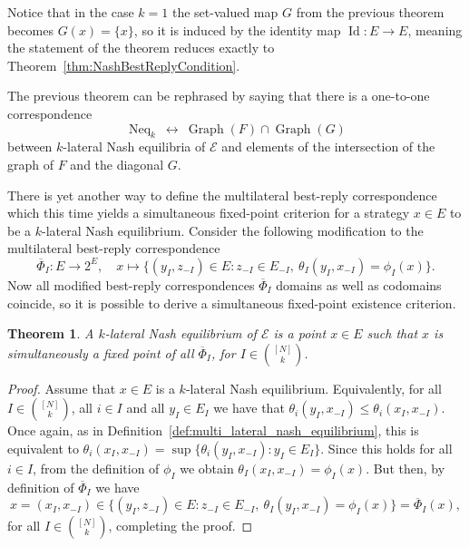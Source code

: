 \documentclass[a4paper,11pt,reqno,english]{amsart}
\theoremstyle{plain}
\newtheorem{theorem}{Theorem}[section]
\theoremstyle{definition}
\newcommand{\Ecal}{\mathcal{E}}
\DeclareMathOperator{\NashEquilibria}{Neq}
\begin{document}
\medskip
Notice that in the case $k = 1$ the set-valued map $G$ from the previous theorem becomes $G(x)=\{x\}$, so it is induced by the identity map $\operatorname{Id}\colon E\longrightarrow E$, meaning the statement of the theorem reduces exactly to Theorem~\ref{thm:NashBestReplyCondition}.

\medskip
The previous theorem can be rephrased by saying that there is a one-to-one correspondence
\begin{displaymath}
	\NashEquilibria_k \ \longleftrightarrow  \ \operatorname{Graph}(F)\cap\operatorname{Graph}(G)
\end{displaymath}
between $k$-lateral Nash equilibria of $\Ecal$ and elements of the intersection of the graph of $F$ and the diagonal $G$.

There is yet another way to define the multilateral best-reply correspondence which this time yields a simultaneous fixed-point criterion for a strategy $x\in E$ to be a $k$-lateral Nash equilibrium. Consider the following modification to the multilateral best-reply correspondence
\begin{displaymath}
	\overline{\Phi}_I\colon E\longrightarrow 2^{E}, \quad x\longmapsto \{(y_I, z_{-I})\in E \colon z_{-I}\in E_{-I},\ \theta_I(y_I, x_{-I}) = \phi_I(x)\}.
\end{displaymath}
Now all modified best-reply correspondences $\overline{\Phi}_I$ domains as well as codomains coincide, so it is possible to derive a simultaneous fixed-point existence criterion.
\begin{theorem}\label{thm:SimultaneousFixedPointCriterion}
	A $k$-lateral Nash equilibrium of $\Ecal$ is a point $x\in E$ such that $x$ is simultaneously a fixed point of all $\overline{\Phi}_I$, for $I\in\binom{[N]}{k}$.
\end{theorem}
\begin{proof}
	Assume that $x\in E$ is a $k$-lateral Nash equilibrium. Equivalently, for all $I\in\binom{[N]}{k}$, all $i\in I$ and all $y_I\in E_I$ we have that $\theta_i(y_I,x_{-I}) \leq \theta_i(x_{I}, x_{-I})$. Once again, as in Definition~\ref{def:multi_lateral_nash_equilibrium}, this is equivalent to $\theta_i(x_{I},x_{-I}) = \sup\{\theta_i(y_I,x_{-I})\colon y_I \in E_I\}$. Since this holds for all $i\in I$, from the definition of $\phi_I$ we obtain $\theta_I(x_I,x_{-I}) = \phi_I(x)$. But then, by definition of $\overline{\Phi}_I$ we have
	\begin{displaymath}
		x = (x_I, x_{-I}) \in \{(y_I, z_{-I})\in E \colon z_{-I}\in E_{-I},\ \theta_I(y_I, x_{-I}) = \phi_I(x)\} = \overline{\Phi}_I(x),
	\end{displaymath}
	for all $I\in\binom{[N]}{k}$, completing the proof.
\end{proof}
\end{document}
